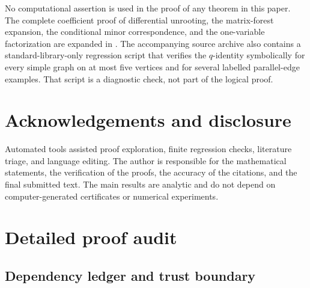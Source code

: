 \documentclass[11pt]{article}
\numberwithin{equation}{section}
\begin{document}
No computational assertion is used in the proof of any theorem in this paper.  The complete coefficient proof of differential unrooting, the matrix-forest expansion, the conditional minor correspondence, and the one-variable factorization are expanded in .  The accompanying source archive also contains a standard-library-only regression script that verifies the $q$-identity symbolically for every simple graph on at most five vertices and for several labelled parallel-edge examples.  That script is a diagnostic check, not part of the logical proof.

\section*{Acknowledgements and disclosure}

Automated tools assisted proof exploration, finite regression checks, literature triage, and language editing.  The author is responsible for the mathematical statements, the verification of the proofs, the accuracy of the citations, and the final submitted text.  The main results are analytic and do not depend on computer-generated certificates or numerical experiments.

\appendix

\section{Detailed proof audit}\label{app:audit}

\subsection{Dependency ledger and trust boundary}\label{app:ledger}
\end{document}
